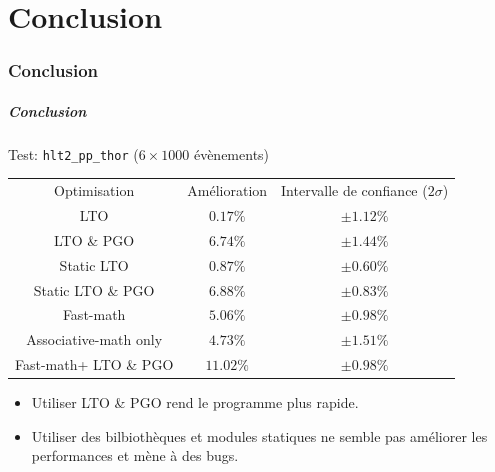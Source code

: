 \documentclass{beamer}
\begin{document}
\part{Conclusion}
\section*{Conclusion}

\begin{frame}[fragile]
    \frametitle{Conclusion}

    Test: \verb'hlt2_pp_thor' ($6 \times 1000$ évènements)
    \begin{center}
        \begin{tabular}{ c c c }
            Optimisation                           & Amélioration & Intervalle de confiance ($2\sigma$) \\
            LTO                                    & $0.17\%$     & $\pm 1.12\%$                        \\
            LTO \& PGO                             & $6.74\%$     & $\pm 1.44\%$                        \\
            Static LTO                             & $0.87\%$     & $\pm 0.60\%$                        \\
            Static LTO \& PGO                      & $6.88\%$     & $\pm 0.83\%$                        \\
            Fast-math\footnotemark[1]              & $5.06\%$     & $\pm 0.98\%$                        \\
            Associative-math only                  & $4.73\%$     & $\pm 1.51\%$                        \\
            Fast-math\footnotemark[1] + LTO \& PGO & $11.02\%$    & $\pm 0.98\%$
        \end{tabular}
    \end{center}

    \begin{itemize}
        \item Utiliser LTO \& PGO rend le programme plus rapide.
        \item Utiliser des bilbiothèques et modules statiques ne semble pas améliorer les performances et mène à des bugs.
    \end{itemize}
\end{frame}


\appendix
\end{document}
